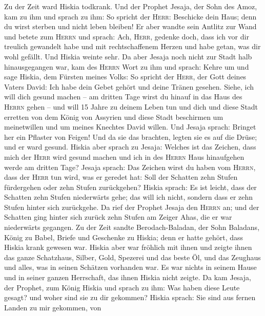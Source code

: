  Zu der Zeit ward Hiskia todkrank. Und der Prophet Jesaja,
der Sohn des Amoz, kam zu ihm und sprach zu ihm: So spricht der
\textsc{Herr}: Beschicke dein Haus; denn du wirst sterben und nicht
leben bleiben!  Er aber wandte sein Antlitz zur Wand und
betete zum \textsc{Herrn} und sprach:  Ach, \textsc{Herr},
gedenke doch, dass ich vor dir treulich gewandelt habe und mit
rechtschaffenem Herzen und habe getan, was dir wohl gefällt. Und Hiskia
weinte sehr.  Da aber Jesaja noch nicht zur Stadt halb
hinausgegangen war, kam des \textsc{Herrn} Wort zu ihm und sprach:
 Kehre um und sage Hiskia, dem Fürsten meines Volks: So
spricht der \textsc{Herr}, der Gott deines Vaters David: Ich habe dein
Gebet gehört und deine Tränen gesehen. Siehe, ich will dich gesund
machen -- am dritten Tage wirst du hinauf in das Haus des \textsc{Herrn}
gehen --  und will 15 Jahre zu deinem Leben tun und dich
und diese Stadt erretten von dem König von Assyrien und diese Stadt
beschirmen um meinetwillen und um meines Knechtes David willen.
 Und Jesaja sprach: Bringet her ein Pflaster von Feigen!
Und da sie das brachten, legten sie es auf die Drüse; und er ward
gesund.  Hiskia aber sprach zu Jesaja: Welches ist das
Zeichen, dass mich der \textsc{Herr} wird gesund machen und ich in des
\textsc{Herrn} Haus hinaufgehen werde am dritten Tage? 
Jesaja sprach: Das Zeichen wirst du haben vom \textsc{Herrn}, dass der
\textsc{Herr} tun wird, was er geredet hat: Soll der Schatten zehn
Stufen fürdergehen oder zehn Stufen zurückgehen?  Hiskia
sprach: Es ist leicht, dass der Schatten zehn Stufen niederwärts gehe;
das will ich nicht, sondern dass er zehn Stufen hinter sich zurückgehe.
 Da rief der Prophet Jesaja den \textsc{Herrn} an; und
der Schatten ging hinter sich zurück zehn Stufen am Zeiger Ahas, die er
war niederwärts gegangen.  Zu der Zeit sandte
Berodach-Baladan, der Sohn Baladans, König zu Babel, Briefe und
Geschenke zu Hiskia; denn er hatte gehört, dass Hiskia krank gewesen
war.  Hiskia aber war fröhlich mit ihnen und zeigte ihnen
das ganze Schatzhaus, Silber, Gold, Spezerei und das beste Öl, und das
Zeughaus und alles, was in seinen Schätzen vorhanden war. Es war nichts
in seinem Hause und in seiner ganzen Herrschaft, das ihnen Hiskia nicht
zeigte.  Da kam Jesaja, der Prophet, zum König Hiskia und
sprach zu ihm: Was haben diese Leute gesagt? und woher sind sie zu dir
gekommen? Hiskia sprach: Sie sind aus fernen Landen zu mir gekommen, von
